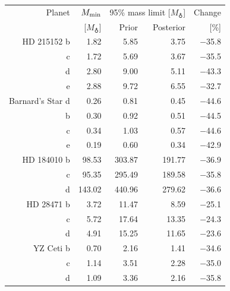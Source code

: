 \begin{tabular}{rrrrr}
\hline
Planet & $M_{\rm min}$ & \multicolumn{2}{c}{95\% mass limit [$M_{\earth}$]} & Change \\
 & [$M_{\earth}$] & Prior & Posterior & [\%] \\
\hline
HD 215152 b & 1.82 & 5.85 & 3.75 & $-$35.8 \\
c & 1.72 & 5.69 & 3.67 & $-$35.5 \\
d & 2.80 & 9.00 & 5.11 & $-$43.3 \\
e & 2.88 & 9.72 & 6.55 & $-$32.7 \\
\hline
Barnard's Star d & 0.26 & 0.81 & 0.45 & $-$44.6 \\
b & 0.30 & 0.92 & 0.51 & $-$44.5 \\
c & 0.34 & 1.03 & 0.57 & $-$44.6 \\
e & 0.19 & 0.60 & 0.34 & $-$42.9 \\
\hline
HD 184010 b & 98.53 & 303.87 & 191.77 & $-$36.9 \\
c & 95.35 & 295.49 & 189.58 & $-$35.8 \\
d & 143.02 & 440.96 & 279.62 & $-$36.6 \\
\hline
HD 28471 b & 3.72 & 11.47 & 8.59 & $-$25.1 \\
c & 5.72 & 17.64 & 13.35 & $-$24.3 \\
d & 4.91 & 15.25 & 11.65 & $-$23.6 \\
\hline
YZ Ceti b & 0.70 & 2.16 & 1.41 & $-$34.6 \\
c & 1.14 & 3.51 & 2.28 & $-$35.0 \\
d & 1.09 & 3.36 & 2.16 & $-$35.8 \\
\hline
\end{tabular}
